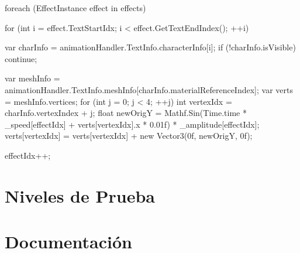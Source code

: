 \begin{mypython}[caption={Ejemplo de código utilizado para definir la animación de 'Wobble' en el texto.},label={alg:wobbleAnimation}]
    foreach (EffectInstance effect in effects) 
    {
        for (int i = effect.TextStartIdx; i < effect.GetTextEndIndex(); ++i)
        {
            var charInfo = animationHandler.TextInfo.characterInfo[i];
            if (!charInfo.isVisible)
            {
                continue;
            }
            
            var meshInfo = animationHandler.TextInfo.meshInfo[charInfo.materialReferenceIndex];
            var verts = meshInfo.vertices;
            for (int j = 0; j < 4; ++j)
            {
                int vertexIdx = charInfo.vertexIndex + j;
                float newOrigY = Mathf.Sin(Time.time * _speed[effectIdx] + verts[vertexIdx].x * 0.01f) * _amplitude[effectIdx];
                verts[vertexIdx] = verts[vertexIdx] + new Vector3(0f, newOrigY, 0f);
            }
        }
        effectIdx++;
    }
\end{mypython}

\section{Niveles de Prueba}


\section{Documentación}

